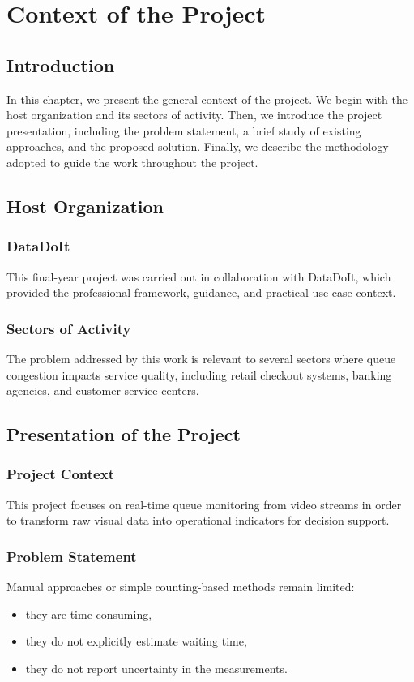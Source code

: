 \chapter{Context of the Project}
\chaptertoc

\section{Introduction}
In this chapter, we present the general context of the project. We begin with the host organization and its sectors of activity. Then, we introduce the project presentation, including the problem statement, a brief study of existing approaches, and the proposed solution. Finally, we describe the methodology adopted to guide the work throughout the project.

\section{Host Organization}

\subsection{DataDoIt}
This final-year project was carried out in collaboration with DataDoIt, which provided the professional framework, guidance, and practical use-case context.

\subsection{Sectors of Activity}
The problem addressed by this work is relevant to several sectors where queue congestion impacts service quality, including retail checkout systems, banking agencies, and customer service centers.

\section{Presentation of the Project}

\subsection{Project Context}
This project focuses on real-time queue monitoring from video streams in order to transform raw visual data into operational indicators for decision support.

\subsection{Problem Statement}
Manual approaches or simple counting-based methods remain limited:
\begin{itemize}
    \item they are time-consuming,
    \item they do not explicitly estimate waiting time,
    \item they do not report uncertainty in the measurements.
\end{itemize}

